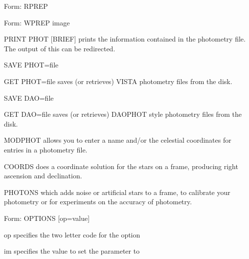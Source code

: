 {\newpage\clearpage
{}%
\begin{command}
  \item[Form: RPREP\hfill]{}
\end{command}%
\lthtmlfigureZ
\lthtmlcheckvsize\clearpage}

{\newpage\clearpage
{}%
\begin{command}
  \item[Form: WPREP image\hfill]{}
\end{command}%
\lthtmlfigureZ
\lthtmlcheckvsize\clearpage}

{\newpage\clearpage
{}%
\begin{example}
  \item[PRINT PHOT {[BRIEF]}\hfill]{prints the information contained in
       the photometry file.  The output of this can be redirected.}
  \item[SAVE PHOT=file\hfill]{}
\par
\item[GET PHOT=file\hfill]{saves (or retrieves) VISTA photometry
       files from the disk.}
\par
\item[SAVE DAO=file\hfill]{}
\par
\item[GET DAO=file \hfill]{saves (or retrieves) DAOPHOT style photometry
       files from the disk.}
\par
\item[MODPHOT\hfill]{allows you to enter a name and/or the
       celestial coordinates for entries in a photometry file.}
\end{example}%
\lthtmlfigureZ
\lthtmlcheckvsize\clearpage}

{\newpage\clearpage
{}%
\begin{example}
  \item[COORDS\hfill]{does a coordinate solution for the stars
on a frame, producing right ascension and declination.}
  \item[PHOTONS\hfill]{which adds noise or artificial stars
to a frame, to calibrate your photometry
or for experiments on the accuracy of photometry.}
\end{example}%
\lthtmlfigureZ
\lthtmlcheckvsize\clearpage}

{\newpage\clearpage
{}%
\begin{command}
  \item[Form: OPTIONS {[op=value]} \hfill]{}
  \item[op]{specifies the two letter code for the option}
  \item[im]{specifies the value to set the parameter to}
\end{command}%
\lthtmlfigureZ
\lthtmlcheckvsize\clearpage}

